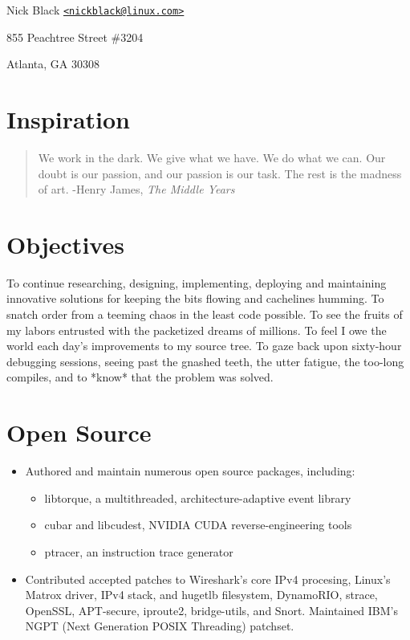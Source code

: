\documentclass[11pt]{article}
\newenvironment{tightitemize}
{\begin{itemize}
  \setlength{\itemsep}{1pt}
  \setlength{\parskip}{0pt}
  \setlength{\parsep}{0pt}}
{\end{itemize}}
\begin{document}
\small Nick Black \href{mailto:nickblack@linux.com}{\nolinkurl{<nickblack@linux.com>}}

\tiny 855 Peachtree Street \#3204

\tiny Atlanta, GA 30308

\section{Inspiration}
\begin{quote}
We work in the dark. We give what we have. We do what we can.
Our doubt is our passion, and our passion is our task.
The rest is the madness of art. -Henry James, \textit{The Middle Years}
\end{quote}

\section{Objectives}
To continue researching, designing, implementing, deploying and maintaining
innovative solutions for keeping the bits flowing and cachelines humming.
To snatch order from a teeming chaos in the least code possible. To see the
fruits of my labors entrusted with the packetized dreams of millions. To feel I
owe the world each day's improvements to my source tree. To gaze back upon
sixty-hour debugging sessions, seeing past the gnashed teeth, the utter
fatigue, the too-long compiles, and to *know* that the problem was solved.

\section{Open Source}
\begin{tightitemize}
\item Authored and maintain numerous open source packages, including:
\begin{tightitemize}
\item libtorque, a multithreaded, architecture-adaptive event library
\item cubar and libcudest, NVIDIA CUDA reverse-engineering tools
\item ptracer, an instruction trace generator
\end{tightitemize}
\item Contributed accepted patches to Wireshark's core IPv4 procesing, Linux's
  Matrox driver, IPv4 stack, and hugetlb filesystem, DynamoRIO,
  strace, OpenSSL, APT-secure, iproute2, bridge-utils, and Snort.
  Maintained IBM's NGPT (Next Generation POSIX Threading) patchset.
\end{tightitemize}
\end{document}
